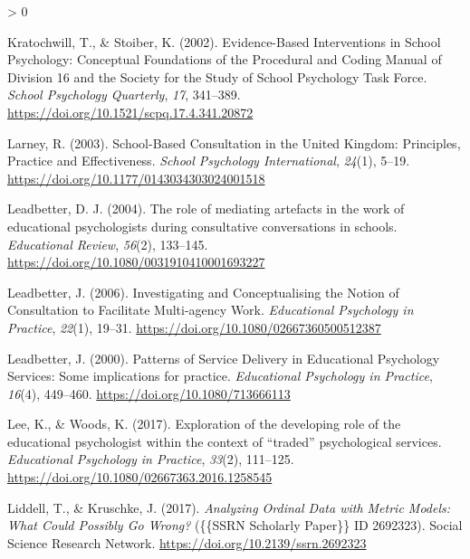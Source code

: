 \documentclass[
  english,
  man]{apa7}
\newlength{\cslhangindent}
\newenvironment{CSLReferences}[2] %
 {%
  \setlength{\parindent}{0pt}
  \ifodd #1 \everypar{\setlength{\hangindent}{\cslhangindent}}\ignorespaces\fi
  \ifnum #2 > 0
  \setlength{\parskip}{#2\baselineskip}
  \fi
 }%
 {}
\begin{document}
\begin{CSLReferences}{1}{0}
\leavevmode\hypertarget{ref-kratochwillEvidenceBasedInterventionsSchool2002}{}%
Kratochwill, T., \& Stoiber, K. (2002). Evidence-{Based Interventions} in {School Psychology}: {Conceptual Foundations} of the {Procedural} and {Coding Manual} of {Division} 16 and the {Society} for the {Study} of {School Psychology Task Force}. \emph{School Psychology Quarterly}, \emph{17}, 341--389. \url{https://doi.org/10.1521/scpq.17.4.341.20872}

\leavevmode\hypertarget{ref-larneySchoolBasedConsultationUnited2003}{}%
Larney, R. (2003). School-{Based Consultation} in the {United Kingdom}: {Principles}, {Practice} and {Effectiveness}. \emph{School Psychology International}, \emph{24}(1), 5--19. \url{https://doi.org/10.1177/0143034303024001518}

\leavevmode\hypertarget{ref-leadbetterRoleMediatingArtefacts2004}{}%
Leadbetter, D. J. (2004). The role of mediating artefacts in the work of educational psychologists during consultative conversations in schools. \emph{Educational Review}, \emph{56}(2), 133--145. \url{https://doi.org/10.1080/0031910410001693227}

\leavevmode\hypertarget{ref-leadbetterInvestigatingConceptualisingNotion2006}{}%
Leadbetter, J. (2006). Investigating and {Conceptualising} the {Notion} of {Consultation} to {Facilitate Multi}-agency {Work}. \emph{Educational Psychology in Practice}, \emph{22}(1), 19--31. \url{https://doi.org/10.1080/02667360500512387}

\leavevmode\hypertarget{ref-leadbetterPatternsServiceDelivery2000}{}%
Leadbetter, J. (2000). Patterns of {Service Delivery} in {Educational Psychology Services}: {Some} implications for practice. \emph{Educational Psychology in Practice}, \emph{16}(4), 449--460. \url{https://doi.org/10.1080/713666113}

\leavevmode\hypertarget{ref-leeExplorationDevelopingRole2017}{}%
Lee, K., \& Woods, K. (2017). Exploration of the developing role of the educational psychologist within the context of {``traded''} psychological services. \emph{Educational Psychology in Practice}, \emph{33}(2), 111--125. \url{https://doi.org/10.1080/02667363.2016.1258545}

\leavevmode\hypertarget{ref-liddellAnalyzingOrdinalData2017}{}%
Liddell, T., \& Kruschke, J. (2017). \emph{Analyzing {Ordinal Data} with {Metric Models}: {What Could Possibly Go Wrong}?} (\{\{SSRN Scholarly Paper\}\} ID 2692323). {Social Science Research Network}. \url{https://doi.org/10.2139/ssrn.2692323}


\end{CSLReferences}
\end{document}
